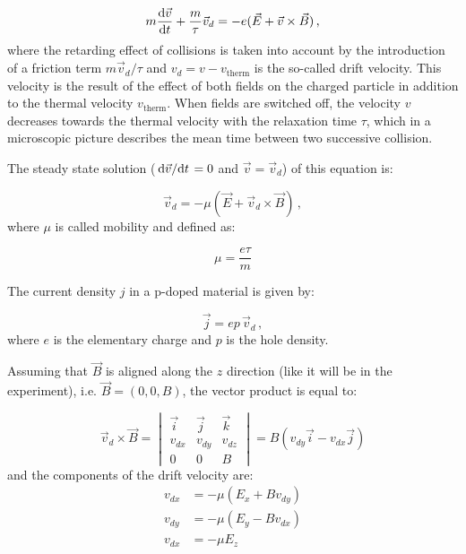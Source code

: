 \documentclass[11pt,a4paper]{article}
\begin{document}
\begin{equation}\label{eq:Drude}
m\dv{\vec{v}}{t}+\frac{m}{\tau}\vec{v}_d=-e(\vec{E}+\vec{v}\times\vec{B})\,,
\end{equation}
where the retarding effect of collisions is taken into account by the introduction of a friction term $m\vec{v}_d/\tau$ and $v_d=v-v_\text{therm}$ is the so-called drift velocity. This velocity is the result of the effect of both fields on the charged particle in addition to the thermal velocity $v_\text{therm}$. When fields are switched off, the velocity $v$ decreases towards the thermal velocity with the relaxation time $\tau$, which in a microscopic picture describes the mean time between two successive collision.

The steady state solution ($\dv*{\vec{v}}{t}=0$ and $\vec{v}=\vec{v}_d$) of this equation is:

\begin{equation*}
\vec{v}_d=-\mu (\vec{E}+\vec{v}_d\times\vec{B})\,,
\end{equation*}
where $\mu$ is called mobility and defined as:

\begin{equation}\label{eq:mobility}
\mu=\frac{e\tau}{m}
\end{equation}

The current density $j$ in a p-doped material is given by:

\begin{equation}\label{eq:current_density}
\vec{j}=ep\,\vec{v}_d\,,
\end{equation}
where $e$ is the elementary charge and $p$ is the hole density.

Assuming that $\vec{B}$ is aligned along the $z$ direction (like it will be in the experiment), i.e. $\vec{B}=(0,0,B)$, the vector product is equal to:

\begin{equation*}
\vec{v}_d\times\vec{B}=
\begin{vmatrix}
\vec{i} & \vec{j} & \vec{k} \\
v_{dx} & v_{dy} & v_{dz} \\
0 & 0 & B
\end{vmatrix}=B\left(v_{dy}\vec{i} - v_{dx}\vec{j}\right)
\end{equation*}
and the components of the drift velocity are:
\begin{align}\nonumber
v_{dx} &= -\mu\left(E_x+Bv_{dy}\right)\\ \label{eq:drift_velocity_components}
v_{dy} &= -\mu\left(E_y - Bv_{dx}\right)\\\nonumber
v_{dx} &= -\mu E_z
\end{align}
\end{document}
